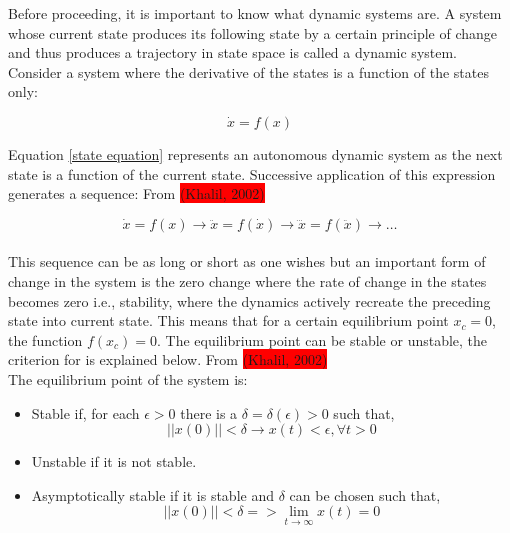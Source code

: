 \documentclass{UoNMCHA}
\numberwithin{equation}{section}
\begin{document}
Before proceeding, it is important to know what dynamic systems are. A system whose current state produces its following state by a certain principle of change and thus produces a trajectory in state space is called a dynamic system. Consider a system where the derivative of the states is a function of the states only:

\begin{equation} \label{state equation}
\dot{x} = f(x)
\end{equation} 

Equation \ref{state equation} represents an autonomous dynamic system as the next state is a function of the current state. Successive application of this expression generates a sequence: From \colorbox{red}{(Khalil, 2002)}

\begin{equation} \label{arrows equation}
\dot{x}=f\left(x\right)\rightarrow\ddot{x}=f\left(\dot{x}\right)\rightarrow\dddot{x}=f\left(\ddot{x}\right)\rightarrow\ldots
\end{equation} \\

This sequence can be as long or short as one wishes but an important form of change in the system is the zero change where the rate of change in the states becomes zero i.e., stability, where the dynamics actively recreate the preceding state into current state. This means that for a certain equilibrium point $x_{c}= 0$, the function $f(x_{c})=0$. The equilibrium point can be stable or unstable, the criterion for is explained below. From \colorbox{red}{(Khalil, 2002)} \\

The equilibrium point of the system is: \\

\begin{itemize}
	\item 	Stable if, for each $\epsilon>0$ there is a $\delta=\delta (\epsilon)>0$ such that,
	\begin{equation*}
		\left|\left|x\left(0\right)\right|\right|<\delta\rightarrow x(t)<\epsilon,\forall t>0  
	\end{equation*}
 	\item Unstable if it is not stable.
 	\item Asymptotically stable if it is stable and $\delta$ can be chosen such that,
	\begin{equation*}
	\left|\left|x\left(0\right)\right|\right|<\delta=>\lim_{t\to \infty}{x(t)=0}
	\end{equation*}
	
\end{itemize}
\end{document}
